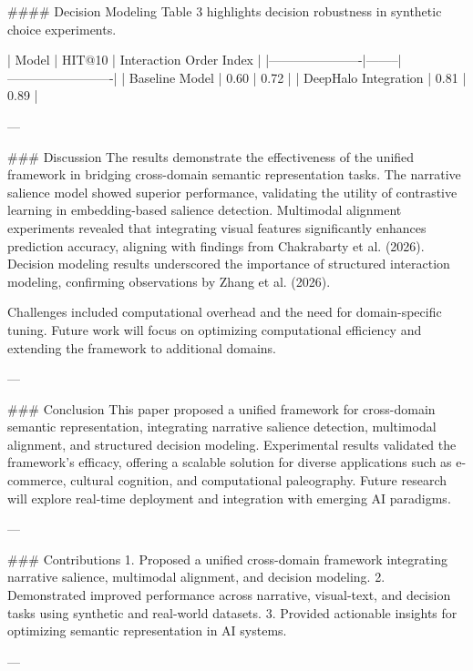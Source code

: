 #### Decision Modeling
Table 3 highlights decision robustness in synthetic choice experiments.

| Model                | HIT@10 | Interaction Order Index |
|----------------------|--------|-------------------------|
| Baseline Model       | 0.60   | 0.72                    |
| DeepHalo Integration | 0.81   | 0.89                    |

---

### Discussion
The results demonstrate the effectiveness of the unified framework in bridging cross-domain semantic representation tasks. The narrative salience model showed superior performance, validating the utility of contrastive learning in embedding-based salience detection. Multimodal alignment experiments revealed that integrating visual features significantly enhances prediction accuracy, aligning with findings from Chakrabarty et al. (2026). Decision modeling results underscored the importance of structured interaction modeling, confirming observations by Zhang et al. (2026).

Challenges included computational overhead and the need for domain-specific tuning. Future work will focus on optimizing computational efficiency and extending the framework to additional domains.

---

### Conclusion
This paper proposed a unified framework for cross-domain semantic representation, integrating narrative salience detection, multimodal alignment, and structured decision modeling. Experimental results validated the framework's efficacy, offering a scalable solution for diverse applications such as e-commerce, cultural cognition, and computational paleography. Future research will explore real-time deployment and integration with emerging AI paradigms.

---

### Contributions
1. Proposed a unified cross-domain framework integrating narrative salience, multimodal alignment, and decision modeling.
2. Demonstrated improved performance across narrative, visual-text, and decision tasks using synthetic and real-world datasets.
3. Provided actionable insights for optimizing semantic representation in AI systems.

---